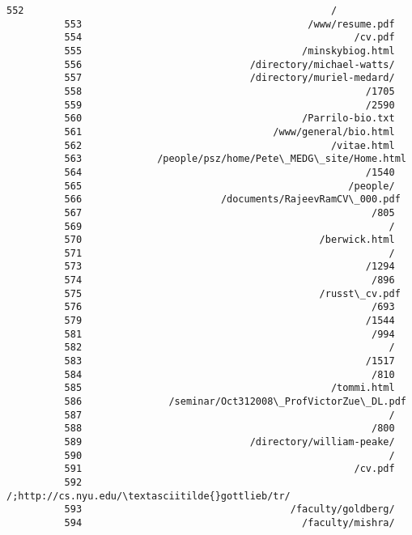 \documentclass[11pt]{article}
\begin{document}
\begin{Verbatim}[commandchars=\\\{\}]
          552                                                     /
          553                                       /www/resume.pdf
          554                                               /cv.pdf
          555                                      /minskybiog.html
          556                             /directory/michael-watts/
          557                             /directory/muriel-medard/
          558                                                 /1705
          559                                                 /2590
          560                                      /Parrilo-bio.txt
          561                                 /www/general/bio.html
          562                                           /vitae.html
          563             /people/psz/home/Pete\_MEDG\_site/Home.html
          564                                                 /1540
          565                                              /people/
          566                        /documents/RajeevRamCV\_000.pdf
          567                                                  /805
          569                                                     /
          570                                         /berwick.html
          571                                                     /
          573                                                 /1294
          574                                                  /896
          575                                         /russt\_cv.pdf
          576                                                  /693
          579                                                 /1544
          581                                                  /994
          582                                                     /
          583                                                 /1517
          584                                                  /810
          585                                           /tommi.html
          586               /seminar/Oct312008\_ProfVictorZue\_DL.pdf
          587                                                     /
          588                                                  /800
          589                             /directory/william-peake/
          590                                                     /
          591                                               /cv.pdf
          592                     /;http://cs.nyu.edu/\textasciitilde{}gottlieb/tr/
          593                                    /faculty/goldberg/
          594                                      /faculty/mishra/

\end{Verbatim}
\end{document}
